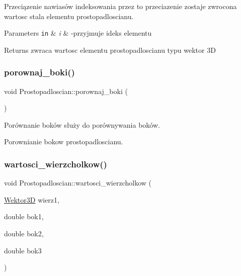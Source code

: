 Przeciązenie nawiasów indeksowania przez to przeciazenie zostaje zwrocona wartosc stala elementu prostopadloscianu. 


\begin{DoxyParams}[1]{Parameters}
\mbox{\tt in}  & {\em i} & -\/przyjmuje ideks elementu \\
\hline
\end{DoxyParams}
\begin{DoxyReturn}{Returns}
zwraca wartosc elementu prostopadloscianu typu wektor 3D 
\end{DoxyReturn}
\mbox{\label{classProstopadloscian_a8f2fad07ecd0f22a288b9c261170269d}} 
\subsubsection{\texorpdfstring{porownaj\+\_\+boki()}{porownaj\_boki()}}
{\footnotesize\ttfamily void Prostopadloscian\+::porownaj\+\_\+boki (\begin{DoxyParamCaption}{ }\end{DoxyParamCaption})}



Porównanie boków służy do porównywania boków. 

Porownianie bokow prostopadloscianu. \mbox{\label{classProstopadloscian_aca07adf3c6635ea252713b5326732c8f}} 
\subsubsection{\texorpdfstring{wartosci\+\_\+wierzcholkow()}{wartosci\_wierzcholkow()}}
{\footnotesize\ttfamily void Prostopadloscian\+::wartosci\+\_\+wierzcholkow (\begin{DoxyParamCaption}\item[{\hyperlink{classWektor}{Wektor3D}}]{wierz1,  }\item[{double}]{bok1,  }\item[{double}]{bok2,  }\item[{double}]{bok3 }\end{DoxyParamCaption})}



